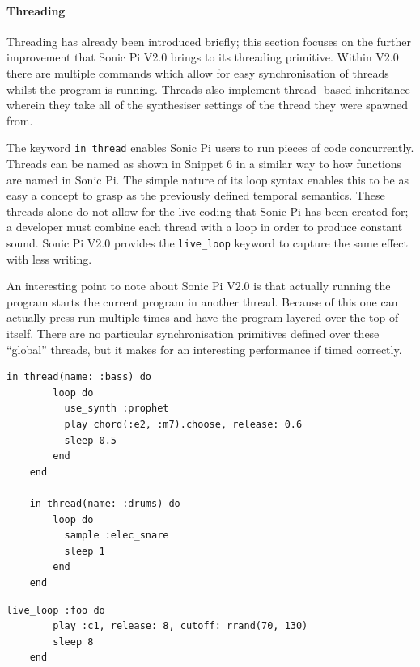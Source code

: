 \documentclass[11pt, abstracton, twoside, titlepage=true]{scrartcl}
\begin{document}
\paragraph{Threading}

Threading has already been introduced briefly; this section focuses on the 
further improvement that Sonic Pi V2.0 brings to its threading primitive. 
Within V2.0 there are multiple commands which allow for easy synchronisation 
of threads whilst the program is running. Threads also implement thread-
based inheritance wherein they take all of the synthesiser settings of the 
thread they were spawned from.

The keyword \texttt{in\_thread} enables Sonic Pi users to run pieces of 
code concurrently. Threads can be named as shown in Snippet 6 in a similar way 
to how functions are named in Sonic Pi. The simple nature of its loop syntax 
enables this to be as easy a concept to grasp as the previously defined 
temporal semantics. These threads alone do not allow for the live coding that 
Sonic Pi has been created for; a developer must combine each thread with a loop
in order to produce constant sound. Sonic Pi V2.0 provides the \texttt{live\_loop}
keyword to capture the same effect with less writing.

An interesting point to note about Sonic Pi V2.0 is that actually running the 
program starts the current program in another thread. Because of this one can 
actually press run multiple times and have the program layered over the top of 
itself. There are no particular synchronisation primitives defined over these 
``global'' threads, but it makes for an interesting performance if timed 
correctly.

\begin{minipage}{\textwidth}
	\begin{lstlisting}[style = sonicpi]
    in_thread(name: :bass) do
        loop do
          use_synth :prophet
          play chord(:e2, :m7).choose, release: 0.6
          sleep 0.5
        end
    end

    in_thread(name: :drums) do
        loop do
          sample :elec_snare
          sleep 1
        end
    end
	\end{lstlisting}
\end{minipage}

\begin{minipage}{\textwidth}
	\begin{lstlisting}[style = sonicpi]
    live_loop :foo do
        play :c1, release: 8, cutoff: rrand(70, 130)
        sleep 8
    end
	\end{lstlisting}
\end{minipage}
\end{document}
